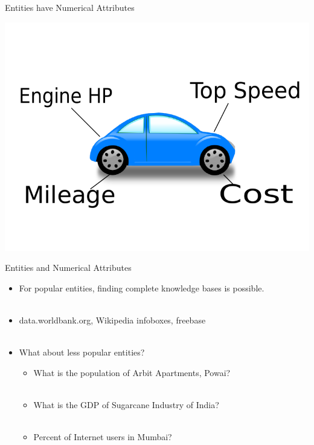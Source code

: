 \documentclass{beamer}
\begin{document}
\begin{frame}{Entities have Numerical Attributes}
 \begin{center}
 \includegraphics[scale=0.45]{images/car.pdf}
\end{center}

\end{frame}

\begin{frame}{Entities and Numerical Attributes}
 
 \begin{itemize}

  \item For popular entities, finding complete knowledge bases is possible.  \\~\\
  \item data.worldbank.org, Wikipedia infoboxes, freebase \\~\\
  \item What about less popular entities?
    \begin{itemize}
      \item What is the population of Arbit Apartments, Powai? \\~\\
      \item What is the GDP of Sugarcane Industry of India?  \\~\\
      \item Percent of Internet users in Mumbai? 
    \end{itemize}
 \end{itemize} 
\end{frame}
\end{document}
